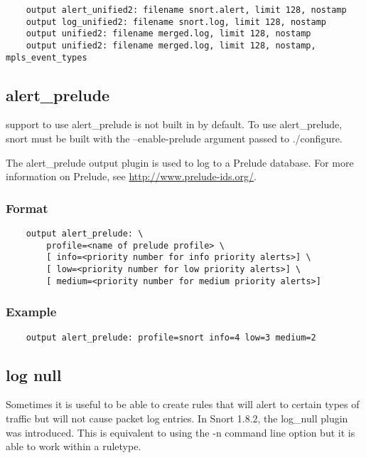 \documentclass[english]{report}
\newenvironment{note}{
\samepage
    \vspace{10pt}{\textsf{
        {\hspace{7pt}\Huge{$\triangle$\hspace{-12.5pt}{\Large{$^!$}}}}\hspace{5pt}
        {\Large{NOTE}}
    }
    }
   \begin{center}
    \par\vspace{-17pt}

    \begin{lrbox}{\savepar}
    \begin{minipage}[r]{6in}
}
{
    \end{minipage}
    \end{lrbox}
    \fbox{
        \usebox{
            \savepar
	}
    }
    \par\vskip10pt
    \end{center}
}
\newenvironment{note}{
        \begin{rawhtml}
        <p><table border="1"><tr><td><b>
        Note:&nbsp;&nbsp;</b>
        \end{rawhtml}
}{
        \begin{rawhtml}
        </b></td></tr></table></p>
        \end{rawhtml}
}
\begin{document}
\begin{verbatim}
    output alert_unified2: filename snort.alert, limit 128, nostamp
    output log_unified2: filename snort.log, limit 128, nostamp
    output unified2: filename merged.log, limit 128, nostamp
    output unified2: filename merged.log, limit 128, nostamp, mpls_event_types
\end{verbatim}

\subsection{alert\_prelude}

\begin{note}

support to use alert\_prelude is not built in by default.  To use
alert\_prelude, snort must be built with the --enable-prelude argument passed
to ./configure.

\end{note}

The alert\_prelude output plugin is used to log to a Prelude database.  For
more information on Prelude, see \url{http://www.prelude-ids.org/}.

\subsubsection{Format}

\begin{verbatim}
    output alert_prelude: \
        profile=<name of prelude profile> \
        [ info=<priority number for info priority alerts>] \
        [ low=<priority number for low priority alerts>] \
        [ medium=<priority number for medium priority alerts>]
\end{verbatim}

\subsubsection{Example}

\begin{verbatim}
    output alert_prelude: profile=snort info=4 low=3 medium=2
\end{verbatim}

\subsection{log null}

Sometimes it is useful to be able to create rules that will alert to certain
types of traffic but will not cause packet log entries.  In Snort 1.8.2, the
log\_null plugin was introduced. This is equivalent to using the -n command
line option but it is able to work within a ruletype.
\end{document}
